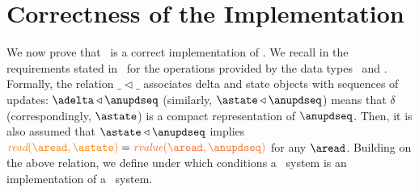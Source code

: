 
\section{Correctness of the Implementation}
\label{sec:simulation}

We now prove that  \igsp\ is a correct implementation 
of \gsp. We recall in  the requirements stated in~\cite{DBLP:conf/ecoop/BurckhardtLPF15}
for the operations provided by the data types 
\statetype\ and \deltatype. 
Formally,  the relation $\_\triangleleft \_$ associates 
 delta and state objects with sequences of updates: $\adelta\triangleleft\anupdseq$
 (similarly, $\astate\triangleleft\anupdseq$)  means  that $\delta$ (correspondingly, $\astate$) 
 is a compact representation of $\anupdseq$. Then, it is also assumed that 
$\astate\triangleleft\anupdseq$ implies  $\iread \aread \astate  = \rvalue \aread  \anupdseq$ for any $\aread$.
Building on the above relation, we define under which conditions a
\igsp\ system is an implementation of a \gsp\ system.

